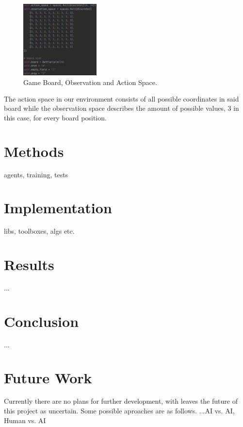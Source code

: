 \documentclass[sigconf]{acmart}
\begin{document}
\vspace{5mm} %

\begin{figure}
 \includegraphics[width=40mm]{spaces.png}
  \caption{Game Board, Observation and Action Space.}
  \label{fig:spaces}
\end{figure}

The action space in our environment consists of all possible coordinates in said board while the observation space describes the amount of possible values, 3 in this case, for every board position.

\vfill %

\section{Methods}
 agents, training, tests

\section{Implementation}
 libs, toolboxes, algs etc.
 
 \section{Results}
 ...
 
 \section{Conclusion}
  ...
  
  \section{Future Work}
Currently there are no plans for further development, with leaves the future of  this project as uncertain. Some possible aproaches are as follows. 
...AI vs. AI, Human vs. AI
\end{document}
